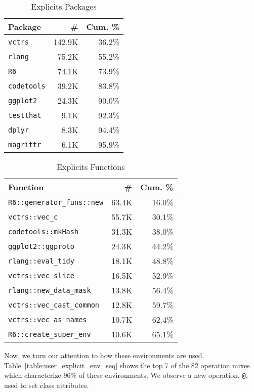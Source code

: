 \documentclass[sigplan,screen]{acmart}
\renewcommand{\c}[1]{\lstinline |#1|\xspace}
\begin{document}
\begin{table}[!h]
  \small
  \caption{Explicits Packages} \label{table:user_explicit_pack}
  \centering
  \begin{tabular}{lrr}
    \toprule
    \textbf{Package}&\textbf{\#}&\textbf{Cum. \%}\\
    \midrule
    \c{vctrs}&142.9K&36.2\%\\
    \c{rlang}&75.2K&55.2\%\\
    \c{R6}&74.1K&73.9\%\\
    \c{codetools}&39.2K&83.8\%\\
    \c{ggplot2}&24.3K&90.0\%\\
    \c{testthat}&9.1K&92.3\%\\
    \c{dplyr}&8.3K&94.4\%\\
    \c{magrittr}&6.1K&95.9\%\\
    \bottomrule
  \end{tabular}
\end{table}


\begin{table}[!h]
  \small
  \caption{Explicits Functions} \label{table:user_explicit_fun}
  \centering
  \begin{tabular}{lrr}\toprule
    \textbf{Function}&\textbf{\#}&\textbf{Cum. \%}\\
    \midrule
    \c{R6::generator_funs::new}&63.4K&16.0\%\\
    \c{vctrs::vec_c}&55.7K&30.1\%\\
    \c{codetools::mkHash}&31.3K&38.0\%\\
    \c{ggplot2::ggproto}&24.3K&44.2\%\\
    \c{rlang::eval_tidy}&18.1K&48.8\%\\
    \c{vctrs::vec_slice}&16.5K&52.9\%\\
    \c{rlang::new_data_mask}&13.8K&56.4\%\\
    \c{vctrs::vec_cast_common}&12.8K&59.7\%\\
    \c{vctrs::vec_as_names}&10.7K&62.4\%\\
    \c{R6::create_super_env}&10.6K&65.1\%\\
    \bottomrule
  \end{tabular}
\end{table}


Now, we turn our attention to how these environments are used.
Table~\ref{table:user_explicit_env_seq} shows the top 7 of the 82 operation
mixes which characterize 96\% of these environments. We observe a new operation,
\texttt{@}, used to set class attributes.
\end{document}
